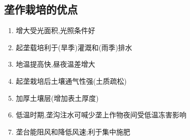 \documentclass[a4paper]{article}
\begin{document}
    \subsection{垄作栽培的优点}
    \begin{enumerate}
        \item 增大受光面积,光照条件好
        \item 起垄载培利于(旱季)灌溉和(雨季)排水
        \item 地温提高快,昼夜温差增大
        \item 起垄栽培后土壤通气性强(土质疏松)
        \item 加厚土壤层(增加表土厚度)
        \item 低温时期,垄沟注水可喊少垄上作物夜间受低温冻害影响
        \item 垄台能阻风和降低风速;利于集中施肥
    \end{enumerate}
\end{document}

